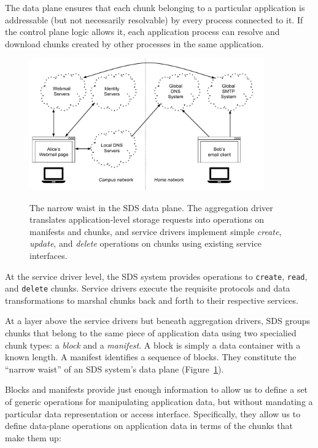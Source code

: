 The data plane ensures that each chunk belonging to a particular application
is addressable (but not necessarily resolvable) by every process connected to it.
If the control plane logic allows it, each application
process can resolve and download chunks created by other processes in the same
application.

\begin{figure}[h]
   \caption{The narrow waist in the SDS data plane.  The aggregation driver
   translates application-level storage requests into operations on manifests
   and chunks, and service drivers implement simple \textit{create},
   \textit{update}, and \textit{delete} operations on chunks using existing
   service interfaces.}
   \centering
   \includegraphics[width=0.9\textwidth,page=4]{figures/dissertation-figures}
   \label{fig:chap2-narrow-waist}
\end{figure}

At the service driver level, the SDS
system provides operations to \texttt{create}, \texttt{read}, and
\texttt{delete} chunks.  Service drivers execute the requisite protocols
and data transformations to
marshal chunks back and forth to their respective services.

At a layer above the service drivers but beneath aggregation drivers, SDS
groups chunks that belong to the same piece of application data using two specialied
chunk types:  a \emph{block} and a \emph{manifest}.  A block is simply a data
container with a known length.  A manifest identifies a sequence of blocks.
They constitute the ``narrow waist'' of an SDS system's data plane
(Figure~\ref{fig:chap2-narrow-waist}).

Blocks and manifests provide just enough information to allow us to define a
set of generic operations for manipulating application data, but
without mandating a particular data representation or access interface.
Specifically, they allow us to define data-plane operations on
application data in terms of the chunks that make them up:

